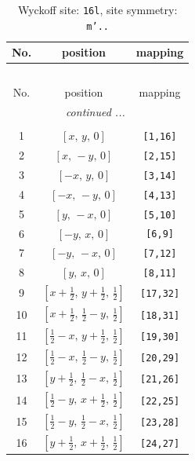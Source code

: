 \documentclass[fleqn,8pt]{jsarticle}
\begin{document}
\renewcommand{\arraystretch}{1.2}
\begin{longtable}{ccc}
\caption{Wyckoff site: {\tt 16l}, site symmetry: {\tt m'..}}
 \\
 \hline \hline
No. & position & mapping \\ \hline \endfirsthead

\multicolumn{2}{l}{\tablename\ \thetable{}} \\
 \hline \hline
No. & position & mapping \\ \hline \endhead

 \hline \hline
\multicolumn{2}{r}{\footnotesize\it continued ...} \\ \endfoot

 \hline \hline
\multicolumn{2}{r}{} \\ \endlastfoot

1 & $\left[ x,\, y,\, 0 \right]$ & {\tt [1,16]} \\ \hline
2 & $\left[ x,\, - y,\, 0 \right]$ & {\tt [2,15]} \\ \hline
3 & $\left[ - x,\, y,\, 0 \right]$ & {\tt [3,14]} \\ \hline
4 & $\left[ - x,\, - y,\, 0 \right]$ & {\tt [4,13]} \\ \hline
5 & $\left[ y,\, - x,\, 0 \right]$ & {\tt [5,10]} \\ \hline
6 & $\left[ - y,\, x,\, 0 \right]$ & {\tt [6,9]} \\ \hline
7 & $\left[ - y,\, - x,\, 0 \right]$ & {\tt [7,12]} \\ \hline
8 & $\left[ y,\, x,\, 0 \right]$ & {\tt [8,11]} \\ \hline
9 & $\left[ x + \frac{1}{2},\, y + \frac{1}{2},\, \frac{1}{2} \right]$ & {\tt [17,32]} \\ \hline
10 & $\left[ x + \frac{1}{2},\, \frac{1}{2} - y,\, \frac{1}{2} \right]$ & {\tt [18,31]} \\ \hline
11 & $\left[ \frac{1}{2} - x,\, y + \frac{1}{2},\, \frac{1}{2} \right]$ & {\tt [19,30]} \\ \hline
12 & $\left[ \frac{1}{2} - x,\, \frac{1}{2} - y,\, \frac{1}{2} \right]$ & {\tt [20,29]} \\ \hline
13 & $\left[ y + \frac{1}{2},\, \frac{1}{2} - x,\, \frac{1}{2} \right]$ & {\tt [21,26]} \\ \hline
14 & $\left[ \frac{1}{2} - y,\, x + \frac{1}{2},\, \frac{1}{2} \right]$ & {\tt [22,25]} \\ \hline
15 & $\left[ \frac{1}{2} - y,\, \frac{1}{2} - x,\, \frac{1}{2} \right]$ & {\tt [23,28]} \\ \hline
16 & $\left[ y + \frac{1}{2},\, x + \frac{1}{2},\, \frac{1}{2} \right]$ & {\tt [24,27]} \\
\end{longtable}
\end{document}
